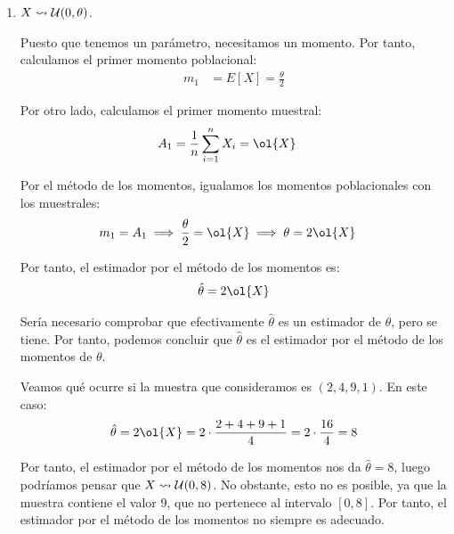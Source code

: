 \begin{ejemplo}
\begin{enumerate}
        Por tanto, el estimador por el método de los momentos es:
        \begin{align*}
            \hat{\lambda} = \ol{X}
        \end{align*}

        \begin{observacion}
            Notemos que, si hubiésemos incluido las igualdades relacionadas con el segundo momento, habríamos obtenido $\hat{\lambda} = Var[X_1, \ldots, X_n]$, por lo que es importante añadir tan solo las igualdades necesarias para obtener el número de ecuaciones igual al número de parámetros.
        \end{observacion}
        \item $X \rightsquigarrow \mathcal{U}(0, \theta)$.
        
        Puesto que tenemos un parámetro, necesitamos un momento. Por tanto, calculamos el primer momento poblacional:
        \begin{align*}
            m_1 &= E[X] = \frac{\theta}{2}
        \end{align*}

        Por otro lado, calculamos el primer momento muestral:
        \begin{align*}
            A_1 &= \frac{1}{n} \sum_{i=1}^{n} X_i = \ol{X}
        \end{align*}

        Por el método de los momentos, igualamos los momentos poblacionales con los muestrales:
        \begin{align*}
            m_1 &= A_1 \implies \frac{\theta}{2} = \ol{X} \implies \theta = 2\ol{X}
        \end{align*}

        Por tanto, el estimador por el método de los momentos es:
        \begin{align*}
            \hat{\theta} = 2\ol{X}
        \end{align*}

        Sería necesario comprobar que efectivamente $\hat{\theta}$ es un estimador de $\theta$, pero se tiene. Por tanto, podemos concluir que $\hat{\theta}$ es el estimador por el método de los momentos de $\theta$.

        \begin{observacion}
            Veamos qué ocurre si la muestra que consideramos es $(2,4,9,1)$. En este caso:
            \begin{align*}
                \hat{\theta} = 2\ol{X} = 2\cdot \frac{2 + 4 + 9 + 1}{4} = 2\cdot \frac{16}{4} = 8
            \end{align*}

            Por tanto, el estimador por el método de los momentos nos da $\hat{\theta} = 8$, luego podríamos pensar que $X\rightsquigarrow \mathcal{U}(0, 8)$. No obstante, esto no es posible, ya que la muestra contiene el valor $9$, que no pertenece al intervalo $[0, 8]$. Por tanto, el estimador por el método de los momentos no siempre es adecuado.
        \end{observacion}
    \end{enumerate}
\end{ejemplo}

